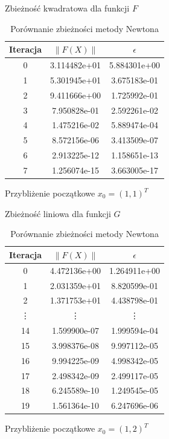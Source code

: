 \documentclass[11pt,wide]{mwart}
\begin{document}
\begin{center}
\begin{table}[!htb]
    \begin{subtable}{.5\linewidth}
      \centering
      \caption{Zbieżność kwadratowa dla funkcji $ F $}
\begin{tabular}{| c | c | c |} \hline
Iteracja & $\|F(X)\|$ & $\epsilon$ \\ \hline
0 & 3.114482e+01 & 5.884301e+00 \\ 
1 & 5.301945e+01 & 3.675183e-01 \\ 
2 & 9.411666e+00 & 1.725992e-01 \\ 
3 & 7.950828e-01 & 2.592261e-02 \\ 
4 & 1.475216e-02 & 5.889474e-04 \\ 
5 & 8.572156e-06 & 3.413509e-07 \\ 
6 & 2.913225e-12 & 1.158651e-13 \\ 
7 & 1.256074e-15 & 3.663005e-17 \\ \hline
\end{tabular}
      \caption*{Przybliżenie początkowe $ x_0 = (1, 1)^T $}
\end{subtable}%
\begin{subtable}{.5\linewidth}
\centering
\caption{Zbieżność liniowa dla funkcji $ G $}
\begin{tabular}{ |c | c | c| } \hline
Iteracja & $\|F(X)\|$ & $\epsilon$ \\ \hline
0 & 4.472136e+00 & 1.264911e+00 \\ 
1 & 2.031359e+01 & 8.820599e-01 \\ 
2 & 1.371753e+01 & 4.438798e-01 \\
\vdots & \vdots & \vdots \\
14 & 1.599900e-07 & 1.999594e-04 \\ 
15 & 3.998376e-08 & 9.997112e-05 \\ 
16 & 9.994225e-09 & 4.998342e-05 \\ 
17 & 2.498342e-09 & 2.499117e-05 \\ 
18 & 6.245589e-10 & 1.249545e-05 \\ 
19 & 1.561364e-10 & 6.247696e-06 \\ \hline
\end{tabular}
\caption*{Przybliżenie początkowe $ x_0 = (1, 2)^T $}
\end{subtable}
\caption{Porównanie zbieżności metody Newtona}
\end{table}
\end{center}
\end{document}
